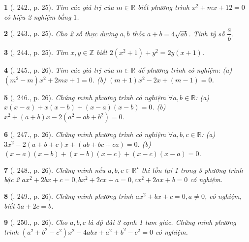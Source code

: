\documentclass{article}
\newtheorem{baitoan}{}
\begin{document}
\begin{baitoan}[\cite{Binh_Toan_9_tap_2}, 242., p. 25]
	Tìm các giá trị của $m\in\mathbb{R}$ biết phương trình $x^2 + mx + 12 = 0$ có hiệu 2 nghiệm bằng $1$.
\end{baitoan}

\begin{baitoan}[\cite{Binh_Toan_9_tap_2}, 243., p. 25]
	Cho 2 số thực dương $a,b$ thỏa $a + b = 4\sqrt{ab}$. Tính tỷ số $\dfrac{a}{b}$.
\end{baitoan}

\begin{baitoan}[\cite{Binh_Toan_9_tap_2}, 244., p. 25]
	Tìm $x,y\in\mathbb{Z}$ biết $2(x^2 + 1) + y^2 = 2y(x + 1)$.
\end{baitoan}

\begin{baitoan}[\cite{Binh_Toan_9_tap_2}, 245., p. 26]
	Tìm các giá trị của $m\in\mathbb{R}$ để phương trình có nghiệm: (a) $(m^2 - m)x^2 + 2mx + 1 = 0$. (b) $(m + 1)x^2 - 2x + (m - 1) = 0$.
\end{baitoan}

\begin{baitoan}[\cite{Binh_Toan_9_tap_2}, 246., p. 26]
	Chứng minh phương trình có nghiệm $\forall a,b\in\mathbb{R}$: (a) $x(x - a) + x(x - b) + (x - a)(x - b) = 0$. (b) $x^2 + (a + b)x - 2(a^2 - ab + b^2) = 0$.
\end{baitoan}

\begin{baitoan}[\cite{Binh_Toan_9_tap_2}, 247., p. 26]
	Chứng minh phương trình có nghiệm $\forall a,b,c\in\mathbb{R}$: (a) $3x^2 - 2(a + b + c)x + (ab + bc + ca) = 0$. (b) $(x - a)(x - b) + (x - b)(x - c) + (x - c)(x - a) = 0$.
\end{baitoan}

\begin{baitoan}[\cite{Binh_Toan_9_tap_2}, 248., p. 26]
	Chứng minh nếu $a,b,c\in\mathbb{R}^\star$ thì tồn tại 1 trong 3 phương trình bậc 2 $ax^2 + 2bx + c = 0,bx^2 + 2cx + a = 0,cx^2 + 2ax + b = 0$ có nghiệm.
\end{baitoan}

\begin{baitoan}[\cite{Binh_Toan_9_tap_2}, 249., p. 26]
	Chứng minh phương trình $ax^2 + bx + c = 0,a\ne0$, có nghiệm, biết $5a + 2c = b$.
\end{baitoan}

\begin{baitoan}[\cite{Binh_Toan_9_tap_2}, 250., p. 26]
	Cho $a,b,c$ là độ dài 3 cạnh 1 tam giác. Chứng minh phương trình $(a^2 + b^2 - c^2)x^2 - 4abx + a^2 + b^2 - c^2 = 0$ có nghiệm.
\end{baitoan}
\end{document}
